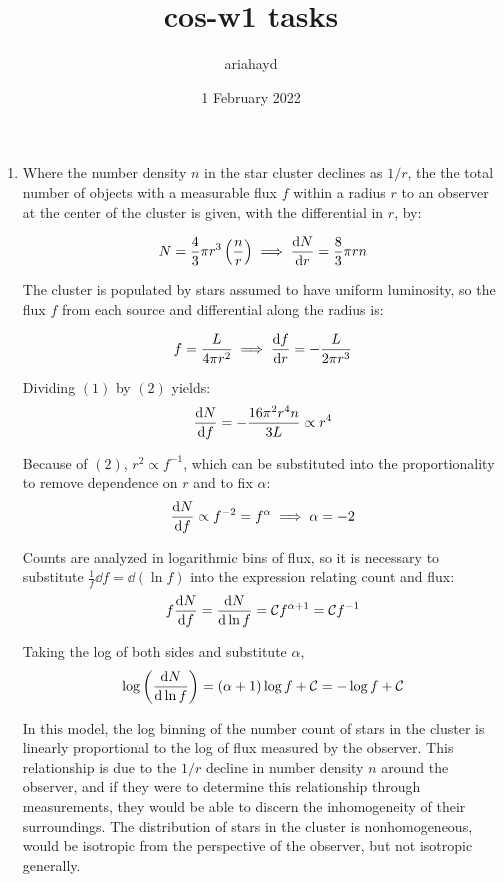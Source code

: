 \documentclass{paper}
\title{cos-w1 tasks}
\author{ariahayd}
\date{1 February 2022}
\begin{document}
 

\maketitle

\begin{enumerate}
    \item 
      Where the number density $n$ in the star cluster declines as 
      $1/r$, the the total number of objects with a measurable flux 
      $f$ within a radius $r$ to an observer at the center of the cluster 
      is given, with the differential in $r$, by: 

      \begin{equation}
        N = \frac{4}{3} \pi r^3 \left( \frac{n}{r} \right) \implies 
        \dv{N}{r} = \frac{8}{3} \pi r n
      \end{equation}

      The cluster is populated by stars assumed to have uniform luminosity, 
      so the flux $f$ from each source and differential along the radius is:

      \begin{equation}
        f = \frac{L}{4 \pi r^2} \implies \dv{f}{r} = -\frac{L}{2 \pi r^3}
      \end{equation}

      Dividing $(1)$ by $(2)$ yields:
      \[ \dv{N}{f} = -\frac{16 \pi^2 r^4 n }{3 L} \propto r^4 \]

      Because of $(2)$, $r^2 \propto f^{-1}$, which can be substituted into 
      the proportionality to remove dependence on $r$ and to fix $\alpha$:
      \[  \dv{N}{f} \propto f^{-2} = f^{\alpha} \implies \alpha = -2 \]

      Counts are analyzed in logarithmic bins of flux, so it is necessary to
      substitute $\frac{1}{f}\dd{f} = \dd{(\ln{f})}$ into the expression 
      relating count and flux:
      \[ f \dv{N}{f} = \dv{N}{\ln{f}}
      = \mathcal{C} f^{\alpha + 1} = \mathcal{C} f^{-1} \]

      Taking the log of both sides and substitute $\alpha$,
      \[ \log{\left(\dv{N}{\ln{f}}\right)} = (\alpha + 1)\log{f} + \mathcal{C}
      = -\log{f} + \mathcal{C} \]

      In this model, the log binning of the number count of stars in the
      cluster is linearly proportional to the log of flux measured by
      the observer. This relationship is due to the $1/r$ decline in number
      density $n$ around the observer, and if they were to determine this
      relationship through measurements, they would be able to discern the
      inhomogeneity of their surroundings. The distribution of stars in the
      cluster is nonhomogeneous, would be isotropic from the perspective of 
      the observer, but not isotropic generally.


\end{enumerate}
\end{document}
